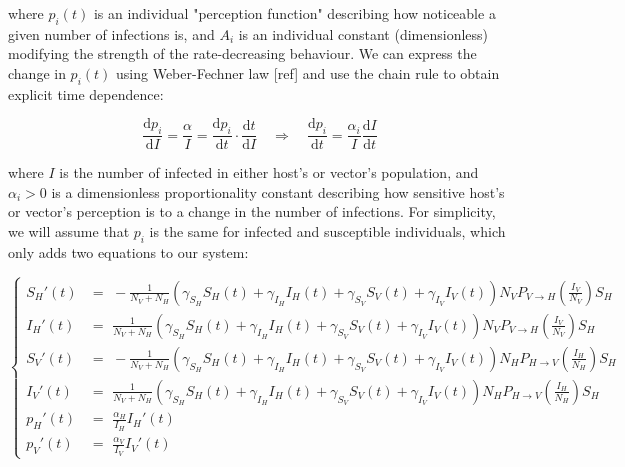 where $p_i(t)$ is an individual "perception function" describing how noticeable a given number of infections is, and $A_i$ is an individual constant (dimensionless) modifying the strength of the rate-decreasing behaviour. We can express the change in $p_i(t)$ using  Weber-Fechner law [ref] and use the chain rule to obtain explicit time dependence:

\begin{equation}
    \frac{\mathrm{d}p_i}{\mathrm{d}I}  = \frac{\alpha}{I} = \frac{\mathrm{d}p_i}{\mathrm{d}t}\cdot \frac{\mathrm{d}t}{\mathrm{d}I} \quad \Longrightarrow \quad \frac{\mathrm{d}p_i}{\mathrm{d}t} = \frac{\alpha_i}{I}\frac{\mathrm{d}I}{\mathrm{d}t} 
\end{equation}

where $I$ is the number of infected in either host's or vector's population, and $\alpha_i>0$ is a dimensionless proportionality constant describing how sensitive host's or vector's perception is to a change in the number of infections. For simplicity, we will assume that $p_i$ is the same for infected and susceptible individuals, which only adds two equations to our system: 

\begin{equation}
\left\{
\begin{array}{cl}
   S_H '(t) & = \,\,-\frac{1}{N_V + N_H}\left(\gamma_{S_H}S_H(t)  + \gamma_{I_H} I_H(t) + \gamma_{S_V} S_V(t) + \gamma_{I_V} I_V(t) \right) N_VP_{V\to H} \left(\frac{I_V}{N_V }\right)S_H  \\
     I_H'(t)& = \,\, \frac{1}{N_V + N_H}\left(\gamma_{S_H}S_H(t)  + \gamma_{I_H} I_H(t) + \gamma_{S_V} S_V(t) + \gamma_{I_V} I_V(t) \right) N_VP_{V\to H} \left(\frac{I_V}{N_V }\right)S_H \\
     S_V'(t)& = \,\, -\frac{1}{N_V + N_H}\left(\gamma_{S_H}S_H(t)  + \gamma_{I_H} I_H(t) + \gamma_{S_V} S_V(t) + \gamma_{I_V} I_V(t) \right) N_HP_{H\to V} \left(\frac{I_H}{N_H }\right)S_H \\
     I_V'(t)& = \,\, \frac{1}{N_V + N_H}\left(\gamma_{S_H}S_H(t)  + \gamma_{I_H} I_H(t) + \gamma_{S_V} S_V(t) + \gamma_{I_V} I_V(t) \right) N_HP_{H\to V} \left(\frac{I_H}{N_H }\right)S_H \\
     p_{H}'(t)& = \,\, \frac{\alpha_H}{I_H}I_H'(t) \\
     p_V'(t) & = \,\, \frac{\alpha_V}{I_V}I_V'(t)
\end{array}
\right.
\end{equation}

\endgroup